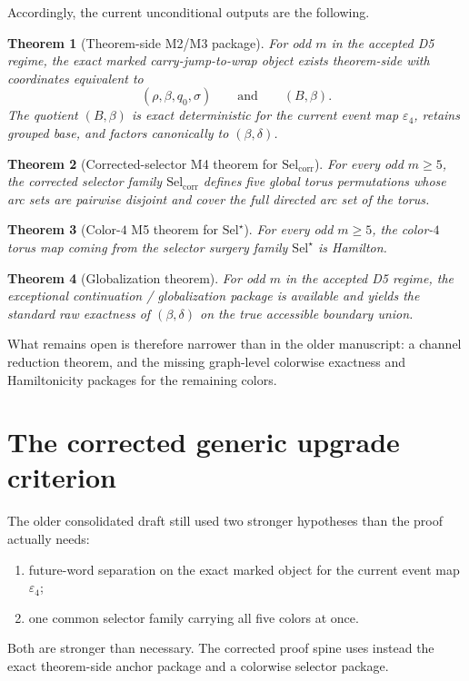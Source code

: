 \documentclass[11pt]{article}
\newtheorem{theorem}{Theorem}[section]
\newcommand{\SelCorr}{\mathrm{Sel}_{\mathrm{corr}}}
\newcommand{\SelStar}{\mathrm{Sel}^{\star}}
\newcommand{\eps}{\varepsilon}
\begin{document}
Accordingly, the current unconditional outputs are the following.

\begin{theorem}[Theorem-side M2/M3 package]
For odd $m$ in the accepted D5 regime, the exact marked carry-jump-to-wrap
object exists theorem-side with coordinates equivalent to
\[
(\rho,\beta,q_0,\sigma)
\qquad\text{and}\qquad
(B,\beta).
\]
The quotient $(B,\beta)$ is exact deterministic for the current event map
$\eps_4$, retains grouped base, and factors canonically to $(\beta,\delta)$.
\end{theorem}

\begin{theorem}[Corrected-selector M4 theorem for $\SelCorr$]
For every odd $m\ge 5$, the corrected selector family $\SelCorr$ defines five
global torus permutations whose arc sets are pairwise disjoint and cover the
full directed arc set of the torus.
\end{theorem}

\begin{theorem}[Color-$4$ M5 theorem for $\SelStar$]
For every odd $m\ge 5$, the color-$4$ torus map coming from the selector
surgery family $\SelStar$ is Hamilton.
\end{theorem}

\begin{theorem}[Globalization theorem]
For odd $m$ in the accepted D5 regime, the exceptional continuation /
globalization package is available and yields the standard raw exactness of
$(\beta,\delta)$ on the true accessible boundary union.
\end{theorem}

What remains open is therefore narrower than in the older manuscript: a channel
reduction theorem, and the missing graph-level colorwise exactness and
Hamiltonicity packages for the remaining colors.

\section{The corrected generic upgrade criterion}

The older consolidated draft still used two stronger hypotheses than the proof
actually needs:
\begin{enumerate}[label=\textup{(\roman*)},leftmargin=2.5em]
\item future-word separation on the exact marked object for the current event
      map $\eps_4$;
\item one common selector family carrying all five colors at once.
\end{enumerate}
Both are stronger than necessary. The corrected proof spine uses instead the
exact theorem-side anchor package and a colorwise selector package.
\end{document}
